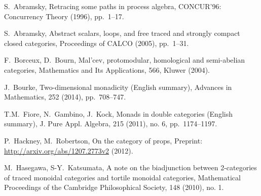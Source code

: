 \documentclass[11pt,oneside,article]{memoir}
\begin{document}
\begin{thebibliography}{XXX}

 S.~Abramsky, Retracing some paths in process algebra, CONCUR'96: Concurrency Theory (1996), pp.~1--17.

 S.~Abramsky, Abstract scalars, loops, and free traced and strongly compact closed categories, Proceedings of CALCO (2005), pp.~1--31.






 F.~Borceux, D.~Bourn, Mal'cev, protomodular, homological and semi-abelian categories, Mathematics
 and Its Applications, 566, Kluwer (2004).

 J.~Bourke, Two-dimensional monadicity (English summary), Advances in Mathematics, 252 (2014), pp.~708--747.

 T.M.~Fiore, N.~Gambino, J.~Kock, Monads in double categories (English summary), J. Pure Appl. Algebra, 215 (2011), no. 6, pp.~1174--1197.


 P.~Hackney, M.~Robertson, On the category of props, Preprint: \url{http://arxiv.org/abs/1207.2773v2} (2012).

M.~Hasegawa, S-Y.~Katsumata, A note on the biadjunction between 2-categories of traced monoidal categories and tortile monoidal categories, Mathematical Proceedings of the Cambridge Philosophical Society, 148 (2010), no. 1.


\end{thebibliography}
\end{document}
